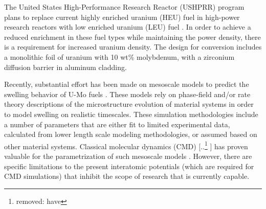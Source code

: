 \documentclass[review]{elsarticle}
\providecommand{\DIFaddtex}[1]{{\protect\color{blue} \sf #1}} %
\providecommand{\DIFdeltex}[1]{{\protect\color{red} [..\footnote{removed: #1} ]}} %
\providecommand{\DIFaddbegin}{} %
\providecommand{\DIFaddend}{} %
\providecommand{\DIFdelbegin}{} %
\providecommand{\DIFdelend}{} %
\providecommand{\DIFadd}[1]{\texorpdfstring{\DIFaddtex{#1}}{#1}} %
\providecommand{\DIFdel}[1]{\texorpdfstring{\DIFdeltex{#1}}{}} %
\newcommand{\DIFscaledelfig}{0.5}
\newlength{\DIFdelgraphicswidth} %
\newlength{\DIFdelgraphicsheight} %
\newcommand{\DIFaddincludegraphics}[2][]{{\color{blue}\fbox{\DIFOincludegraphics[#1]{#2}}}} %
\newcommand{\DIFdelincludegraphics}[2][]{%
\sbox{\DIFdelgraphicsbox}{\DIFOincludegraphics[#1]{#2}}%
\settoboxwidth{\DIFdelgraphicswidth}{\DIFdelgraphicsbox} %
\settoboxtotalheight{\DIFdelgraphicsheight}{\DIFdelgraphicsbox} %
\scalebox{\DIFscaledelfig}{%
\parbox[b]{\DIFdelgraphicswidth}{\usebox{\DIFdelgraphicsbox}\\[-\baselineskip] \rule{\DIFdelgraphicswidth}{0em}}\llap{\resizebox{\DIFdelgraphicswidth}{\DIFdelgraphicsheight}{%
\setlength{\unitlength}{\DIFdelgraphicswidth}%
\begin{picture}(1,1)%
\thicklines\linethickness{2pt} %
{\color[rgb]{1,0,0}\put(0,0){\framebox(1,1){}}}%
{\color[rgb]{1,0,0}\put(0,0){\line( 1,1){1}}}%
{\color[rgb]{1,0,0}\put(0,1){\line(1,-1){1}}}%
\end{picture}%
}\hspace*{3pt}}} %
} %
\DeclareRobustCommand{\DIFaddbegin}{\DIFOaddbegin \let\includegraphics\DIFaddincludegraphics} %
\DeclareRobustCommand{\DIFaddend}{\DIFOaddend \let\includegraphics\DIFOincludegraphics} %
\DeclareRobustCommand{\DIFdelbegin}{\DIFOdelbegin \let\includegraphics\DIFdelincludegraphics} %
\DeclareRobustCommand{\DIFdelend}{\DIFOaddend \let\includegraphics\DIFOincludegraphics} %
\begin{document}
The United States High-Performance Research Reactor (USHPRR) program plans to replace current highly enriched uranium (HEU) fuel in high-power research reactors with low enriched uranium (LEU) fuel \cite{snelgrove1997}. In order to achieve a reduced enrichment in these fuel types while maintaining the power density, there is a requirement for increased uranium density. The design for conversion includes a monolithic foil of uranium with 10 wt\% molybdenum, with a zirconium diffusion barrier in aluminum cladding. 

\DIFdelbegin %

\DIFdelend Recently, substantial effort has been made on mesoscale models to predict the swelling behavior of U-Mo fuels \cite{liang2018, liang2018a, liang2017, liang2016, ye2018, hu2017a, hu2016, hu2016a}. These models rely on phase-field and/or rate theory descriptions of the microstructure evolution of material systems in order to model swelling on realistic timescales. These simulation methodologies include a number of parameters that are either fit to limited experimental data, calculated from lower length scale modeling methodologies, or assumed based on other material systems. Classical molecular dynamics (CMD) \DIFdelbegin \DIFdel{have }\DIFdelend \DIFaddbegin \DIFadd{has }\DIFaddend proven valuable for the parametrization of such mesoscale models \cite{Park2023, Park2021, BeelerMRSA, BeelerRDD, Beeler2020}. However, there are specific limitations to the present interatomic potentials (which are required for CMD simulations) that inhibit the scope of research that is currently capable. 
\end{document}
